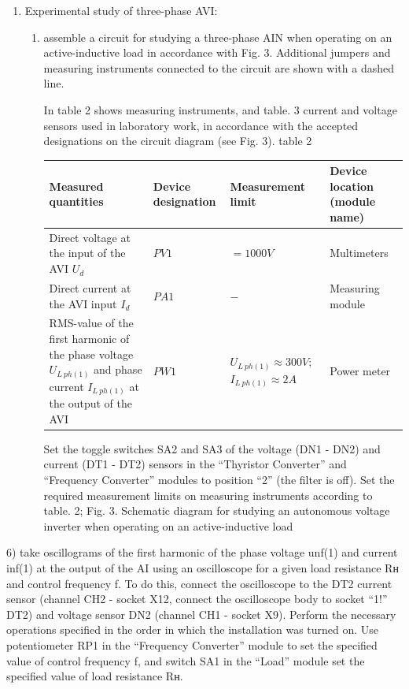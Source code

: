 \documentclass[a4paper,14pt]{article}
\begin{document}
\begin{enumerate}
\begin{enumerate}
\end{enumerate}


\item Experimental study of three-phase AVI:

\begin{enumerate}
\item assemble a circuit for studying a three-phase AIN when operating on an active-inductive load in accordance with Fig. 3. Additional jumpers and measuring instruments connected to the circuit are shown with a dashed line.

In table 2 shows measuring instruments, and table. 3 current and voltage sensors used in laboratory work, in accordance with the accepted designations on the circuit diagram (see Fig. 3).
table 2

\begin{table}[!ht]
\begin{tabular}{p{}p{}p{}p{}}
\toprule
Measured quantities& Device designation& Measurement limit & Device location (module name)\\
\midrule
Direct voltage at the input of the AVI $U_d$& $PV1$ & $=1000V$ &Multimeters\\
\midrule
Direct current at the AVI input $I_d$       & $PA1$ & $-$     & Measuring module\\
\midrule
RMS-value of the first harmonic of the phase voltage $U_{L\:ph(1)}$ and phase current $I_{L\:ph(1)}$ at the output of the AVI& $PW1$ &  $U_{L\:ph(1)}\approx 300V;$ $I_{L\:ph(1)}\approx 2A$ & 
Power meter
\end{tabular}
\end{table}
Set the toggle switches SA2 and SA3 of the voltage (DN1 - DN2) and current (DT1 - DT2) sensors in the “Thyristor Converter” and “Frequency Converter” modules to position “2” (the filter is off). Set the required measurement limits on measuring instruments according to table. 2;
Fig. 3. Schematic diagram for studying an autonomous voltage inverter when operating on an active-inductive load

\end{enumerate}
\end{enumerate}
6) take oscillograms of the first harmonic of the phase voltage unf(1) and current inf(1) at the output of the AI using an oscilloscope for a given load resistance Rн and control frequency f. To do this, connect the oscilloscope to the DT2 current sensor
(channel CH2 - socket X12, connect the oscilloscope body to socket “1!” DT2) and voltage sensor DN2 (channel CH1 - socket X9). Perform the necessary operations specified in the order in which the installation was turned on. Use potentiometer RP1 in the “Frequency Converter” module to set the specified value of control frequency f, and switch SA1 in the “Load” module set the specified value of load resistance Rн.
\end{document}
